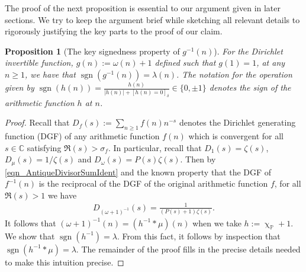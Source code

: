 \documentclass[11pt,reqno,a4letter]{article}
\numberwithin{figure}{section}
\numberwithin{table}{section}
\newcommand{\Iverson}[1]{\ensuremath{\left[#1\right]_{\delta}}}
\renewcommand{\chi}{\upchi}
\theoremstyle{plain}
\newtheorem{prop}[theorem]{Proposition}
\numberwithin{theorem}{section}
\theoremstyle{definition}
\newcommand{\NBRef}[1]{}
\begin{document}
The proof of the next proposition is essential to our argument given in later sections. 
We try to keep the argument brief while sketching all relevant details to rigorously justifying the key parts 
to the proof of our claim. 

\begin{prop}[The key signedness property of $g^{-1}(n)$]
\label{prop_SignageDirInvsOfPosBddArithmeticFuncs_v1} 
For the Dirichlet invertible function, $g(n) := \omega(n) + 1$ defined such that $g(1) = 1$, at any 
$n \geq 1$, we have that $\operatorname{sgn}(g^{-1}(n)) = \lambda(n)$. 
The notation for the operation given by 
$\operatorname{sgn}(h(n)) = \frac{h(n)}{|h(n)| + \Iverson{h(n) = 0}} \in \{0, \pm 1\}$ denotes the sign 
of the arithmetic function $h$ at $n$. 
\NBRef{A02-2020-04-26}
\end{prop} 
\begin{proof} 
Recall that $D_f(s) := \sum_{n \geq 1} f(n) n^{-s}$ denotes the Dirichlet generating function (DGF) of any 
arithmetic function $f(n)$ which is convergent for all $s \in \mathbb{C}$ satisfying $\Re(s) > \sigma_f$. 
In particular, recall that $D_1(s) = \zeta(s)$, $D_{\mu}(s) = 1 / \zeta(s)$ and $D_{\omega}(s) = P(s) \zeta(s)$. 
Then by \eqref{eqn_AntiqueDivisorSumIdent} and the known property that the DGF of $f^{-1}(n)$ is 
the reciprocal of the DGF of the original arithmetic function $f$, for all $\Re(s) > 1$ we have 
\begin{align} 
\label{eqn_DGF_of_gInvn} 
D_{(\omega+1)^{-1}}(s) = \frac{1}{(P(s)+1) \zeta(s)}. 
\end{align} 
It follows that $(\omega + 1)^{-1}(n) = (h^{-1} \ast \mu)(n)$ when we take 
$h := \chi_{\mathbb{P}} + 1$. 
We show that $\operatorname{sgn}(h^{-1}) = \lambda$. From this fact, it follows by inspection 
that $\operatorname{sgn}(h^{-1} \ast \mu) = \lambda$. The remainder of the proof fills in the 
precise details needed to make this intuition precise. 


\end{proof}
\end{document}
